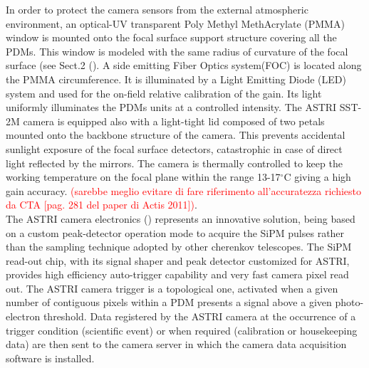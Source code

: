 In order to protect the camera sensors from the external
atmospheric environment, an optical-UV transparent
Poly Methyl MethAcrylate (PMMA)  window 
is mounted onto the focal surface support structure covering all the
PDMs.
This window is modeled with the same radius of
curvature of the focal surface (see Sect.2 (\cite{Catalano2018}).
A side emitting Fiber Optics system(FOC) is located  along the PMMA 
circumference. It is illuminated by a Light Emitting Diode (LED) 
system and used for the on-field relative calibration of the gain. 
Its light uniformly illuminates the PDMs units at a controlled intensity.
The ASTRI SST-2M camera
is equipped also with a light-tight lid composed of two petals
mounted onto the backbone structure of the camera. 
This prevents accidental sunlight exposure of the focal surface
detectors, catastrophic in case of direct light reflected
by the mirrors.  
The camera is thermally controlled to keep the
working temperature on the focal plane within the range 13-17$^\circ$C
giving a high gain accuracy. \textcolor{red}{(sarebbe meglio evitare di fare riferimento all'accuratezza richiesto da CTA [pag. 281 del paper di Actis 2011])}.\\

The ASTRI camera electronics (\cite{Sottile2016}) represents an innovative solution, being based on a custom peak-detector operation mode to acquire the SiPM pulses rather than the sampling technique adopted by other cherenkov telescopes. The SiPM  read-out chip, with its signal shaper and peak detector customized for ASTRI, provides high efficiency auto-trigger capability and very fast camera pixel read out. The ASTRI camera trigger is a topological one, activated when a given number of contiguous pixels within a PDM presents a signal above a given photo-electron threshold. Data registered by the ASTRI camera at the occurrence of a trigger condition (scientific event) or when required (calibration or housekeeping data) are then sent to the camera server in which the camera data acquisition software is installed. 
